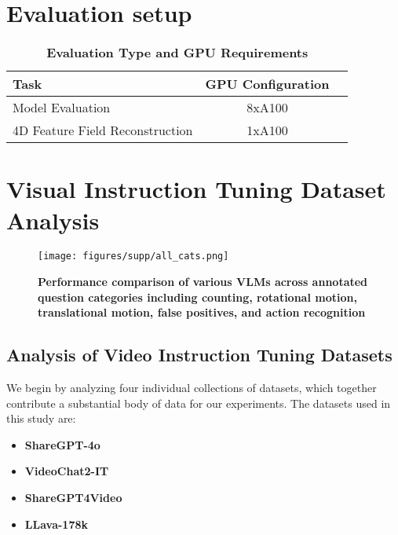 
\section{Evaluation setup}
\label{sec:eval_setup}
\begin{table}[h]
    \centering
    \begin{tabular}{|l|c|c|}
        \hline
        \textbf{Task} & \textbf{GPU Configuration} \\
        \hline
        Model Evaluation & 8xA100 \\
        4D Feature Field Reconstruction & 1xA100 \\
        \hline
    \end{tabular}
    \caption{\textbf{Evaluation Type and GPU Requirements}}
    \label{tab:evaluation_setup}
\end{table}


\section{Visual Instruction Tuning Dataset Analysis}
\label{sec:sft}


\begin{figure*}[t]
  \centering
  \texttt{[image: figures/supp/all\_cats.png]}\vspace{-3mm}
  \caption{\textbf{Performance comparison of various VLMs across annotated
question categories including counting, rotational motion, translational motion, false positives, and action recognition}}
  \label{model_acc_vs_category}
\end{figure*}

\subsection{Analysis of Video Instruction Tuning Datasets}

We begin by analyzing four individual collections of datasets, which together contribute a substantial body of data for our experiments. The datasets used in this study are:

\begin{itemize}
    \item \textbf{ShareGPT-4o}
    \item \textbf{VideoChat2-IT}
    \item \textbf{ShareGPT4Video}
    \item \textbf{LLava-178k} 
\end{itemize}


